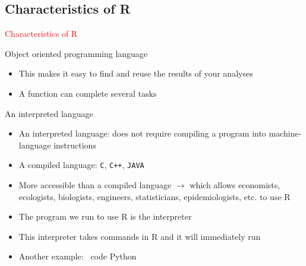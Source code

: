 \documentclass[11pt]{beamer}\usepackage[]{graphicx}\usepackage[]{color}
\newcommand{\code}[1]{\texttt{#1}}
\begin{document}
\subsection{Characteristics of R}

\begin{frame}
 \begin{center}
  \Huge{\textcolor{red}{Characteristics of R}}
 \end{center}
\end{frame}



\begin{frame}{Object oriented programming language}
\begin{itemize}
  \setlength\itemsep{2em}
\item This makes it easy to find and reuse the results of your analyses
\pause \item A function can complete several tasks
\end{itemize}
\end{frame}


\begin{frame}{An interpreted language}
\begin{itemize}
  \setlength\itemsep{1.2em}
\item An interpreted language: does not require compiling a program into machine-language instructions 
\item A compiled language: \code{C}, \code{C++}, \code{JAVA}
\item More accessible than a compiled language $\rightarrow$ which allows economists, ecologists, biologists, engineers, statisticians, epidemiologists, etc. to use R
\pause \item The program we run to use R is the interpreter
\pause \item This interpreter takes commands in R and it will immediately run
\pause \item Another example: \ code {Python}
\end{itemize}
\end{frame}
\end{document}
